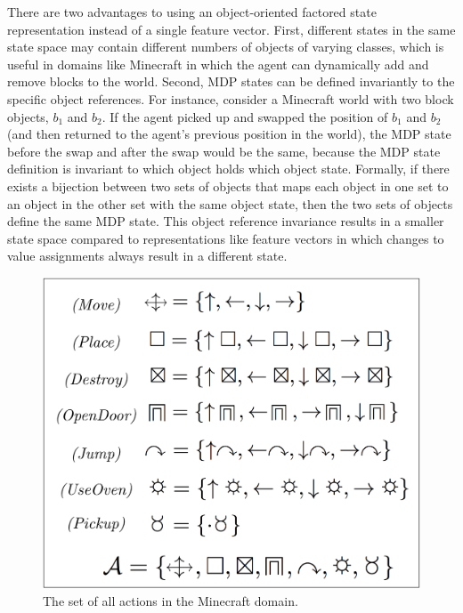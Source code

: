 \documentclass[]{article}
\begin{document}
There are two advantages to using an object-oriented factored state
representation instead of a single feature vector. First, different
states in the same state space may contain different numbers of
objects of varying classes, which is useful in domains like Minecraft
in which the agent can dynamically add and remove blocks to the
world. Second, MDP states can be defined invariantly to the specific
object references.  For instance, consider a Minecraft world with two
block objects, $b_1$ and $b_2$.  If the agent picked up and swapped
the position of $b_1$ and $b_2$ (and then returned to the agent's
previous position in the world), the MDP state before the swap and
after the swap would be the same, because the MDP state definition is
invariant to which object holds which object state.  Formally, if
there exists a bijection between two sets of objects that maps each
object in one set to an object in the other set with the same object
state, then the two sets of objects define the same MDP state.  This
object reference invariance results in a smaller state space compared
to representations like feature vectors in which changes to value
assignments always result in a different state.

\begin{figure}
\centering
\includegraphics[scale = 0.15]{figures/all_actions.png}
\caption{The set of all actions in the Minecraft domain. \label{fig:all_actions}}
\end{figure}
\end{document}
